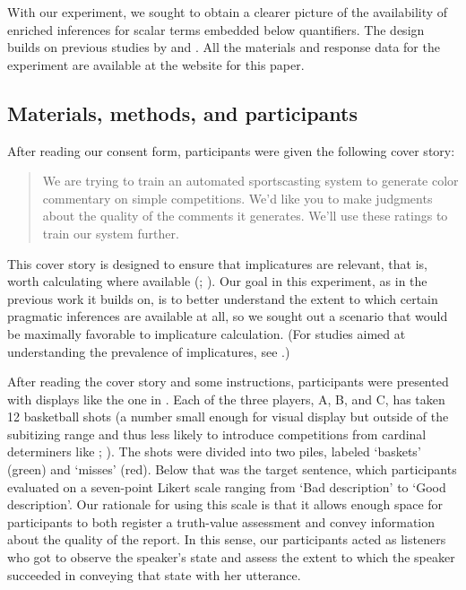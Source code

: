 \documentclass[leqno]{article}
\begin{document}
With our experiment, we sought to obtain a clearer picture of the
availability of enriched inferences for scalar terms embedded below
quantifiers. The design builds on previous studies by
\citet{Geurts:Pouscoulous:2009} and \citet{Chemla:Spector:2011}. All
the materials and response data for the experiment are available at
the website for this paper.


\subsection{Materials, methods, and participants}


After reading our consent form, participants were given the following
cover story:

\begin{quote}
  We are trying to train an automated sportscasting system to generate
  color commentary on simple competitions. We'd like you to make
  judgments about the quality of the comments it generates. We'll use
  these ratings to train our system further.
\end{quote}

This cover story is designed to ensure that implicatures are relevant,
that is, worth calculating where available
(;
\citealt{Clifton:Dube:2010}). Our goal in this experiment, as in the
previous work it builds on, is to better understand the extent to
which certain pragmatic inferences are available at all, so we sought
out a scenario that would be maximally favorable to implicature
calculation. (For studies aimed at understanding the prevalence of
implicatures, see \citealt{Paris:1973,Hendriks-etal:2009}.)

After reading the cover story and some instructions, participants were
presented with displays like the one in . Each of the
three players, A, B, and C, has taken 12 basketball shots (a number
small enough for visual display but outside of the subitizing range
and thus less likely to introduce competitions from cardinal
determiners like ;
\citealt{Degen:Tanenhaus:2014}). The shots were divided into two
piles, labeled `baskets' (green) and `misses' (red). Below that was
the target sentence, which participants evaluated on a seven-point
Likert scale ranging from `Bad description' to `Good description'. Our
rationale for using this scale is that it allows enough space for
participants to both register a truth-value assessment and convey
information about the quality of the report. In this sense, our
participants acted as listeners who got to observe the speaker's state
and assess the extent to which the speaker succeeded in conveying that
state with her utterance.
\end{document}
